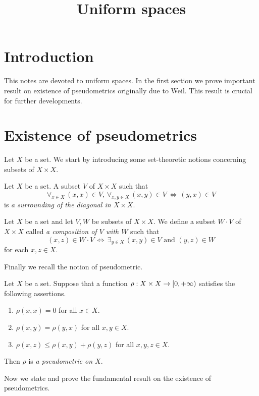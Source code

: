 



\title{Uniform spaces}
\date{}
\maketitle

\section{Introduction}
\noindent
This notes are devoted to uniform spaces. In the first section we prove important result on existence of pseudometrics originally due to Weil. This result is crucial for further developments.

\section{Existence of pseudometrics}
\noindent
Let $X$ be a set. We start by introducing some set-theoretic notions concerning subsets of $X\times X$.

\begin{definition}
Let $X$ be a set. A subset $V$ of $X\times X$ such that
$$\forall_{x\in X}\,(x,x)\in V,\,\forall_{x,y\in X}\,(x,y)\in V\,\Leftrightarrow\,(y,x)\in V$$
is \textit{a surrounding of the diagonal in $X\times X$}.    
\end{definition}

\begin{definition}
Let $X$ be a set and let $V,W$ be subsets of $X\times X$. We define a subset $W\cdot V$ of $X\times X$ called \textit{a composition of $V$ with $W$} such that 
$$(x,z) \in W\cdot V\,\Leftrightarrow\,\exists_{y \in X}\,(x,y)\in V\mbox{ and }(y,z) \in W$$
for each $x,z\in X$.
\end{definition}
\noindent
Finally we recall the notion of pseudometric.

\begin{definition}
Let $X$ be a set. Suppose that a function $\rho:X\times X\rightarrow [0,+\infty)$ satisfies the following assertions.
\begin{enumerate}[label=\textbf{(\arabic*)}, leftmargin=*]
\item $\rho(x,x) = 0$ for all $x\in X$.
\item $\rho(x,y) = \rho(y,x)$ for all $x,y\in X$.
\item $\rho(x,z)\leq \rho(x,y) + \rho(y,z)$ for all $x,y,z\in X$.
\end{enumerate}
Then $\rho$ is \textit{a pseudometric on $X$}.
\end{definition}
\noindent
Now we state and prove the fundamental result on the existence of pseudometrics.

